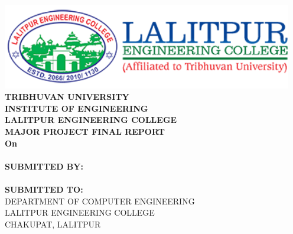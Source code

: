 \begin{center}

    \thispagestyle{empty}

    \includegraphics[width= 5in ]{img/leclogo.png} \\
    \vspace{0.1 in}
    {\fontsize{12 pt}{12} \selectfont\textbf{TRIBHUVAN UNIVERSITY} \\
        \textbf{INSTITUTE OF ENGINEERING} \\
        \textbf{LALITPUR ENGINEERING COLLEGE}} \\

    \vspace{0.5 in}
    \textbf{MAJOR PROJECT FINAL REPORT}\\
    {\fontsize{12 pt}{12} \selectfont\textbf{On}\\}
    {\fontsize{12 pt}{12} \selectfont \textbf{\thetitle}}\\
    \vspace{0.8 in}
    \textbf{ SUBMITTED BY:}  \\
    {\theauthor} \\
    \vspace{0.8 in}
    \textbf{ SUBMITTED TO:}  \\
    \MakeUppercase{Department of Computer Engineering \\
    Lalitpur Engineering College \\
    Chakupat, Lalitpur \\}
    \vspace{0.7 in}
    \thedate
\end{center}